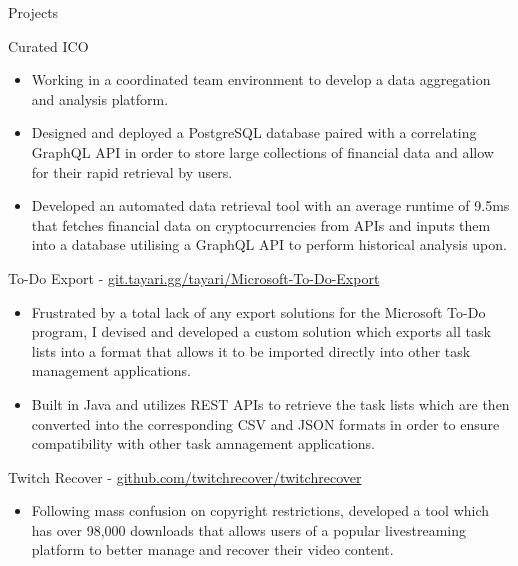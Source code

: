 \documentclass{article}
\newlength{\tabin}
\newlength{\secsep}
\newcommand{\lineunder}{\vspace*{-8pt} \\ \hspace*{-6pt} \hrulefill \\ \vspace*{-15pt}}
\newenvironment{tabbedsection}[1]{
  \begin{list}{}{
      \setlength{\itemsep}{0pt}
      \setlength{\labelsep}{0pt}
      \setlength{\labelwidth}{0pt}
      \setlength{\leftmargin}{\tabin}
      \setlength{\rightmargin}{\tabin}
      \setlength{\listparindent}{0pt}
      \setlength{\parsep}{0pt}
      \setlength{\parskip}{0pt}
      \setlength{\partopsep}{0pt}
      \setlength{\topsep}{#1}
    }
  \item[]
}{\end{list}}
\newenvironment{resume_section}[1]{
  \filbreak
  \vspace{2\secsep}
  \textsc{\color{blue}\large#1}
  \lineunder
  \begin{tabbedsection}{\secsep}
}{\end{tabbedsection}}
\newenvironment{resume_subsection}[2][]{
  \textbf{\color{BlueViolet}#2} \hfill {\normalsize #1} \hspace{-5em} 
  \begin{tabbedsection}{0.5\secsep}
}{\end{tabbedsection}}
\newenvironment{subitems}{
  \renewcommand{\labelitemi}{-}
  \begin{itemize}
      \setlength{\labelsep}{1em}
}{\end{itemize}}
\begin{document}
\begin{resume_section}{Projects}
	\begin{resume_subsection}{Curated ICO}
		\begin{subitems}
			\item Working in a coordinated team environment to develop a data aggregation and analysis platform.
            \item Designed and deployed a PostgreSQL database paired with a correlating GraphQL API in order to store large collections of financial data and allow for their rapid retrieval by users. 
            \item Developed an automated data retrieval tool with an average runtime of 9.5ms that fetches financial data on cryptocurrencies from APIs and inputs them into a database utilising a GraphQL API to perform historical analysis upon. 
		\end{subitems}
	\end{resume_subsection}
	\vspace{2\secsep}
	\begin{resume_subsection}[(February 2021)]{To-Do Export - \faGitlab \hspace{0.01cm} \href{https://git.tayari.gg/tayari/Microsoft-To-Do-Export}{git.tayari.gg/tayari/Microsoft-To-Do-Export}}
  		\begin{subitems} 
            \item Frustrated by a total lack of any export solutions for the Microsoft To-Do program, I devised and developed a custom solution which exports all task lists into a format that allows it to be imported directly into other task management applications.
  			\item Built in Java and utilizes REST APIs to retrieve the task lists which are then converted into the corresponding CSV and JSON formats in order to ensure compatibility with other task amnagement applications.
    		\end{subitems}
  	\end{resume_subsection}
  	\vspace{2\secsep}
	\begin{resume_subsection}{Twitch Recover - \faGithub \hspace{0.01cm} \href{https://github.com/twitchrecover/twitchrecover}{github.com/twitchrecover/twitchrecover}}  
		\begin{subitems}
                \item Following mass confusion on copyright restrictions, developed a tool which has over 98,000 downloads that allows users of a popular livestreaming platform to better manage and recover their video content.

\end{subitems}
\end{resume_subsection}
\end{resume_section}
\end{document}
